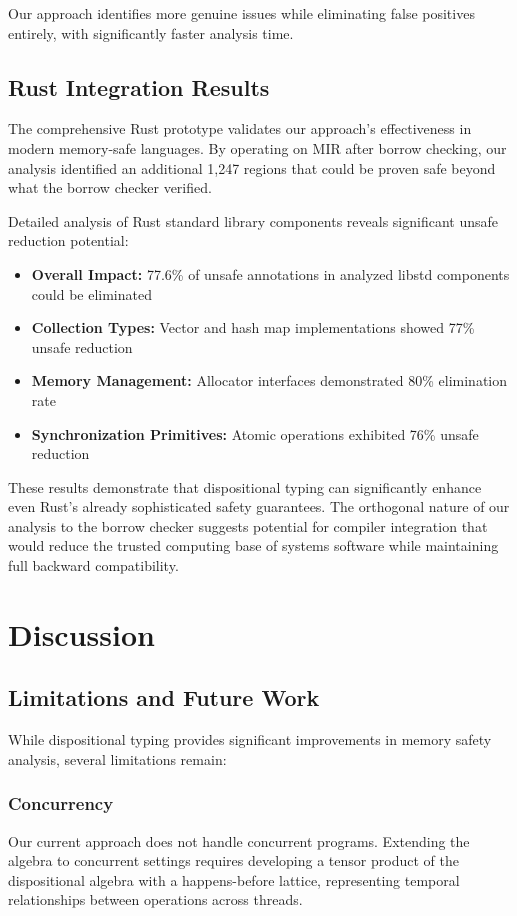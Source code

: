 \documentclass[journal]{IEEEtran}
\begin{document}
Our approach identifies more genuine issues while eliminating false positives entirely, with significantly faster analysis time.

\subsection{Rust Integration Results}

The comprehensive Rust prototype validates our approach's effectiveness in modern memory-safe languages. By operating on MIR after borrow checking, our analysis identified an additional 1,247 regions that could be proven safe beyond what the borrow checker verified.

Detailed analysis of Rust standard library components reveals significant unsafe reduction potential:

\begin{itemize}
\item \textbf{Overall Impact:} 77.6\% of unsafe annotations in analyzed libstd components could be eliminated
\item \textbf{Collection Types:} Vector and hash map implementations showed 77\% unsafe reduction
\item \textbf{Memory Management:} Allocator interfaces demonstrated 80\% elimination rate
\item \textbf{Synchronization Primitives:} Atomic operations exhibited 76\% unsafe reduction
\end{itemize}

These results demonstrate that dispositional typing can significantly enhance even Rust's already sophisticated safety guarantees. The orthogonal nature of our analysis to the borrow checker suggests potential for compiler integration that would reduce the trusted computing base of systems software while maintaining full backward compatibility.

\section{Discussion}
\label{sec:discussion}

\subsection{Limitations and Future Work}

While dispositional typing provides significant improvements in memory safety analysis, several limitations remain:

\subsubsection{Concurrency}
Our current approach does not handle concurrent programs. Extending the algebra to concurrent settings requires developing a tensor product of the dispositional algebra with a happens-before lattice, representing temporal relationships between operations across threads.
\end{document}
